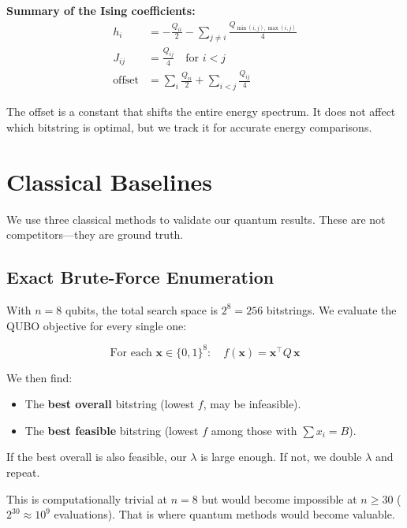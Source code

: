 \documentclass[12pt, a4paper]{article}
\begin{document}
\textbf{Summary of the Ising coefficients:}
\begin{align}
h_i &= -\frac{Q_{ii}}{2} - \sum_{j \neq i} \frac{Q_{\min(i,j),\max(i,j)}}{4}
\label{eq:ising_h} \\[6pt]
J_{ij} &= \frac{Q_{ij}}{4} \quad \text{for } i < j
\label{eq:ising_J} \\[6pt]
\text{offset} &= \sum_i \frac{Q_{ii}}{2} + \sum_{i<j} \frac{Q_{ij}}{4}
\label{eq:ising_offset}
\end{align}

The offset is a constant that shifts the entire energy spectrum. It does not
affect which bitstring is optimal, but we track it for accurate energy
comparisons.


\section{Classical Baselines}

We use three classical methods to validate our quantum results. These are not
competitors---they are ground truth.

\subsection{Exact Brute-Force Enumeration}

With $n = 8$ qubits, the total search space is $2^8 = 256$ bitstrings. We
evaluate the QUBO objective for every single one:

\[
\text{For each } \mathbf{x} \in \{0,1\}^8: \quad
f(\mathbf{x}) = \mathbf{x}^\top Q\, \mathbf{x}
\]

We then find:
\begin{itemize}
    \item The \textbf{best overall} bitstring (lowest $f$, may be infeasible).
    \item The \textbf{best feasible} bitstring (lowest $f$ among those with $\sum x_i = B$).
\end{itemize}

If the best overall is also feasible, our $\lambda$ is large enough. If not,
we double $\lambda$ and repeat.

This is computationally trivial at $n = 8$ but would become impossible at
$n \geq 30$ ($2^{30} \approx 10^9$ evaluations). That is where quantum
methods would become valuable.
\end{document}

